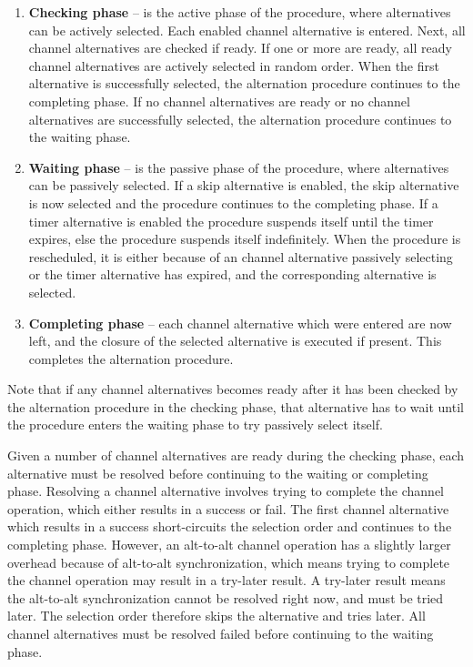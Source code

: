 \begin{enumerate}[topsep=0em,itemsep=-1em,partopsep=0.5em,parsep=1em]
    \item \textbf{Checking phase} -- is the active phase of the procedure, where alternatives can be actively selected. Each enabled channel alternative is entered. Next, all channel alternatives are checked if ready. If one or more are ready, all ready channel alternatives are actively selected in random order. When the first alternative is successfully selected, the alternation procedure continues to the completing phase. If no channel alternatives are ready or no channel alternatives are successfully selected, the alternation procedure continues to the waiting phase.
    \item \textbf{Waiting phase} -- is the passive phase of the procedure, where alternatives can be passively selected. If a skip alternative is enabled, the skip alternative is now selected and the procedure continues to the completing phase. If a timer alternative is enabled the procedure suspends itself until the timer expires, else the procedure suspends itself indefinitely. When the procedure is rescheduled, it is either because of an channel alternative passively selecting or the timer alternative has expired, and the corresponding alternative is selected.
    \item \textbf{Completing phase} -- each channel alternative which were entered are now left, and the closure of the selected alternative is executed if present. This completes the alternation procedure.
\end{enumerate}

Note that if any channel alternatives becomes ready after it has been checked by the alternation procedure in the checking phase, that alternative has to wait until the procedure enters the waiting phase to try passively select itself.

Given a number of channel alternatives are ready during the checking phase, each alternative must be resolved before continuing to the waiting or completing phase. Resolving a channel alternative involves trying to complete the channel operation, which either results in a success or fail. The first channel alternative which results in a success short\hyp{}circuits the selection order and continues to the completing phase. However, an alt\hyp{}to\hyp{}alt channel operation has a slightly larger overhead because of alt\hyp{}to\hyp{}alt synchronization, which means trying to complete the channel operation may result in a try\hyp{}later result. A try\hyp{}later result means the alt\hyp{}to\hyp{}alt synchronization cannot be resolved right now, and must be tried later. The selection order therefore skips the alternative and tries later. All channel alternatives must be resolved failed before continuing to the waiting phase.


